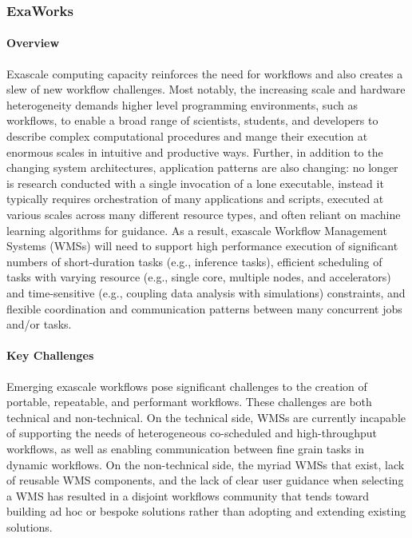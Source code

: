 
\subsubsection{ ExaWorks} \label{subsubsect:exaworks}


\paragraph{Overview} Exascale computing capacity reinforces the need for workflows and also creates
a slew of new workflow challenges. Most notably, the increasing scale and
hardware heterogeneity demands higher level programming environments, such as
workflows, to enable a broad range of scientists, students, and developers to
describe complex computational procedures and mange their execution at
enormous scales in intuitive and productive ways. Further, in addition to the
changing system architectures, application patterns are also changing: no
longer is research conducted with a single invocation of a lone executable,
instead it typically requires orchestration of many applications and scripts,
executed at various scales across many different resource types, and often
reliant on machine learning algorithms for guidance. As a result, exascale
Workflow Management Systems (WMSs) will need to support high performance
execution of significant numbers of short-duration tasks (e.g., inference
tasks), efficient scheduling of tasks with varying resource (e.g., single
core, multiple nodes, and accelerators) and time-sensitive (e.g., coupling
data analysis with simulations) constraints, and flexible coordination and
communication patterns between many concurrent jobs and/or tasks.


\paragraph{Key Challenges}
Emerging exascale workflows pose significant challenges to the creation of
portable, repeatable, and performant workflows. These challenges are both
technical and non-technical. On the technical side, WMSs are currently
incapable of supporting the needs of heterogeneous co-scheduled and
high-throughput workflows, as well as enabling communication between fine
grain tasks in dynamic workflows. On the non-technical side, the myriad WMSs
that exist, lack of reusable WMS components, and the lack of clear user
guidance when selecting a WMS has resulted in a disjoint workflows community
that tends toward building ad hoc or bespoke solutions rather than adopting
and extending existing solutions.

